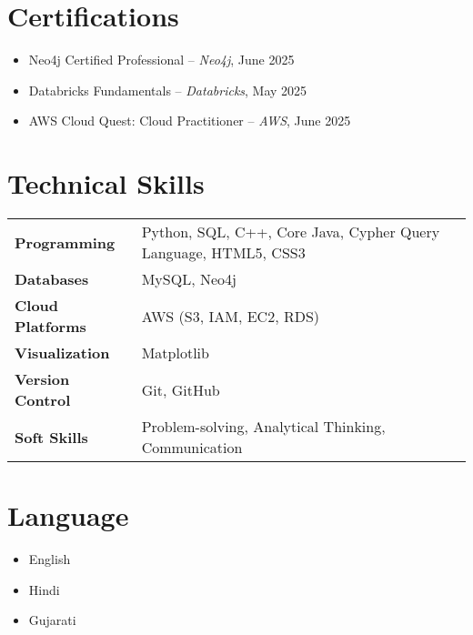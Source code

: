 \documentclass[11pt,a4paper]{article}
\begin{document}

\section*{Certifications}

\begin{itemize}
  \item Neo4j Certified Professional – \textit{Neo4j}, June 2025
  \item Databricks Fundamentals – \textit{Databricks}, May 2025
  \item AWS Cloud Quest: Cloud Practitioner – \textit{AWS}, June 2025
\end{itemize}

\section*{Technical Skills}

\begin{tabular}{@{}ll}
\textbf{Programming}       & Python, SQL, C++, Core Java, Cypher Query Language, HTML5, CSS3 \\[6pt]
\textbf{Databases}         & MySQL, Neo4j \\[6pt]
\textbf{Cloud Platforms}   & AWS (S3, IAM, EC2, RDS) \\[6pt]
\textbf{Visualization}     & Matplotlib \\[6pt]
\textbf{Version Control}   & Git, GitHub \\[6pt]
\textbf{Soft Skills}       & Problem-solving, Analytical Thinking, Communication
\end{tabular}

\section*{Language}
\begin{itemize}
\item English
\item Hindi
\item Gujarati
\end{itemize}
\end{document}
